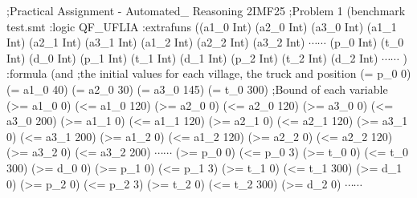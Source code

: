 \selectfont
{\footnotesize
\noindent
;Practical Assignment - Automated\_ Reasoning 2IMF25\newline
;Problem 1\newline
(benchmark test.smt\newline
:logic QF\_UFLIA\newline
:extrafuns \newline
((a1\_0 Int)  (a2\_0 Int)  (a3\_0 Int)\newline
 (a1\_1 Int)  (a2\_1 Int)  (a3\_1 Int)\newline
 (a1\_2 Int)  (a2\_2 Int)  (a3\_2 Int)\newline
 $\cdots \cdots$
 \newline
 (p\_0 Int)    (t\_0 Int)    (d\_0 Int) \newline
 (p\_1 Int)    (t\_1 Int)    (d\_1 Int)\newline
 (p\_2 Int)    (t\_2 Int)    (d\_2 Int)\newline
 $\cdots \cdots$
\newline
)\newline
:formula \newline
(and\newline
 ;the initial values for each village, the truck and position\newline
 (= p\_0 0)\newline
 (= a1\_0 40) \newline
 (= a2\_0 30) \newline
 (= a3\_0 145)\newline
 (= t\_0 300) \newline
 ;Bound of each variable\newline
 (>= a1\_0 0)  (<= a1\_0 120)  (>= a2\_0 0)  (<= a2\_0 120)  (>= a3\_0 0)  (<= a3\_0 200)\newline
 (>= a1\_1 0)  (<= a1\_1 120)  (>= a2\_1 0)  (<= a2\_1 120)  (>= a3\_1 0)  (<= a3\_1 200)\newline
 (>= a1\_2 0)  (<= a1\_2 120)  (>= a2\_2 0)  (<= a2\_2 120)  (>= a3\_2 0)  (<= a3\_2 200)\newline
 $\cdots \cdots$
\newline
 (>= p\_0 0)  (<= p\_0 3)   (>= t\_0 0)  (<= t\_0 300)   (>= d\_0 0) \newline
 (>= p\_1 0)  (<= p\_1 3)   (>= t\_1 0)  (<= t\_1 300)   (>= d\_1 0) \newline
 (>= p\_2 0)  (<= p\_2 3)   (>= t\_2 0)  (<= t\_2 300)   (>= d\_2 0) \newline
 $\cdots \cdots$
\newline
}

